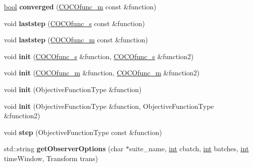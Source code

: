\begin{DoxyCompactItemize}
\item 
\hyperlink{classbool}{bool} {\bfseries converged} (\hyperlink{classCOCOfunc__m}{C\+O\+C\+Ofunc\+\_\+m} const \&function)\hypertarget{classEGO_a63fa2cb88e5c8f455b713203c6abd785}{}\label{classEGO_a63fa2cb88e5c8f455b713203c6abd785}

\item 
void {\bfseries laststep} (\hyperlink{classCOCOfunc__s}{C\+O\+C\+Ofunc\+\_\+s} const \&function)\hypertarget{classEGO_a7f39847739579ee376147ef16060cdf4}{}\label{classEGO_a7f39847739579ee376147ef16060cdf4}

\item 
void {\bfseries laststep} (\hyperlink{classCOCOfunc__m}{C\+O\+C\+Ofunc\+\_\+m} const \&function)\hypertarget{classEGO_ad096fd9ccb2be36a10b3c498faf3efe7}{}\label{classEGO_ad096fd9ccb2be36a10b3c498faf3efe7}

\item 
void {\bfseries init} (\hyperlink{classCOCOfunc__s}{C\+O\+C\+Ofunc\+\_\+s} \&function, \hyperlink{classCOCOfunc__s}{C\+O\+C\+Ofunc\+\_\+s} \&function2)\hypertarget{classEGO_a2917199977d1d7cb0ac6e6270f7e4e25}{}\label{classEGO_a2917199977d1d7cb0ac6e6270f7e4e25}

\item 
void {\bfseries init} (\hyperlink{classCOCOfunc__m}{C\+O\+C\+Ofunc\+\_\+m} \&function, \hyperlink{classCOCOfunc__m}{C\+O\+C\+Ofunc\+\_\+m} \&function2)\hypertarget{classEGO_a4e1e814141e0b17b7c4f8be14d84ec71}{}\label{classEGO_a4e1e814141e0b17b7c4f8be14d84ec71}

\item 
void {\bfseries init} (Objective\+Function\+Type \&function)\hypertarget{classCocoOptimiser_a0c7df5618e3fba607b32cf77190f49cb}{}\label{classCocoOptimiser_a0c7df5618e3fba607b32cf77190f49cb}

\item 
void {\bfseries init} (Objective\+Function\+Type \&function, Objective\+Function\+Type \&function2)\hypertarget{classCocoOptimiser_af261a238b756aeda91f891ca417ebe58}{}\label{classCocoOptimiser_af261a238b756aeda91f891ca417ebe58}

\item 
void {\bfseries step} (Objective\+Function\+Type const \&function)\hypertarget{classCocoOptimiser_ae48180f04b5b40318b4c52cd02862239}{}\label{classCocoOptimiser_ae48180f04b5b40318b4c52cd02862239}

\item 
std\+::string {\bfseries get\+Observer\+Options} (char $\ast$suite\+\_\+name, \hyperlink{classint}{int} cbatch, \hyperlink{classint}{int} batches, \hyperlink{classint}{int} time\+Window, Transform trans)\hypertarget{classCocoOptimiser_ad9591d2b76f7078a956e7cdca1d8ba60}{}\label{classCocoOptimiser_ad9591d2b76f7078a956e7cdca1d8ba60}


\end{DoxyCompactItemize}
